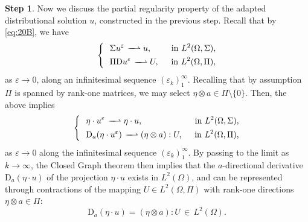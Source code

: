 \documentclass{amsart}
\numberwithin{equation}{section}
\numberwithin{thm}{section}
\theoremstyle{definition}
\newtheorem{proofpart}{Step}
\def\Om{\Omega}
\renewcommand{\:}{\!:\!} %
\newcommand{\e}{\varepsilon}
\newcommand{\weak }{\, -\!\!\!\!\!-\!\!\!\!\rightharpoonup}
\newcommand{\ot}{\otimes}
\renewcommand{\^}[1]{^{#1}_{\phantom{l}}}
\begin{document}
\begin{proofpart} Now we discuss the partial regularity property of the adapted distributional solution $u$, constructed in the previous step. Recall that by \eqref{eq:20B}, we have
\[
\left\{ \ \ 
\begin{split}
&\Sigma u^{\varepsilon} \weak u, \hspace{0.2cm} & \text{in $L^2(\Omega, \Sigma)$}, 
\\
&\Pi \mathrm{D}u^{\varepsilon} \weak U, \hspace{0.2cm} & \text{in $L^2(\Omega, \Pi)$},
\end{split}
\right.
\]
as $\e \to 0$, along an infinitesimal sequence $(\e_k)_1^\infty$. Recalling that by assumption $\Pi$ is spanned by rank-one matrices, we may select $\eta \ot a \in \Pi \setminus \{0\}$. Then, the above implies
\[
\left\{ \ \ 
\begin{split}
&\eta \cdot u^{\varepsilon} \weak \eta \cdot u, \hspace{0.2cm} & \text{in $L^2(\Omega, \Sigma)$}, 
\\
&\mathrm{D}_a (\eta \cdot u^{\varepsilon}) \weak (\eta \ot a) : U, \hspace{0.2cm} & \text{in $L^2(\Omega, \Pi)$},
\end{split}
\right.
\]
as $\e \to 0$ along the infinitesimal sequence  $(\e_k)_1^\infty$.  By passing to the limit as $k\to\infty$, the Closed Graph theorem then implies that the $a$-directional derivative $\mathrm{D}_a (\eta \cdot u)$ of the projection $\eta \cdot u$ exists in $L^2(\Om)$, and can be represented through contractions of the mapping $U \in L^2(\Omega, \Pi)$ with rank-one directions $\eta \ot a \in \Pi$:
\[
\mathrm{D}_a (\eta \cdot u) = (\eta \ot a) : U \, \in \, L^2(\Om).
\]
\end{proofpart}
\end{document}
